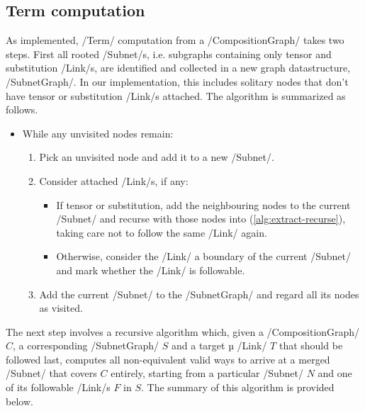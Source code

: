\documentclass[12pt,a4paper]{article}
\begin{document}
\subsection{Term computation}

As implemented, \hs/Term/ computation from a \hs/CompositionGraph/ takes two steps. First all rooted \hs/Subnet/s, i.e. subgraphs containing only tensor and substitution \hs/Link/s, are identified and collected in a new graph datastructure, \hs/SubnetGraph/. In our implementation, this includes solitary nodes that don't have tensor or substitution \hs/Link/s attached. The algorithm is summarized as follows.
\begin{itemize}
    \item While any unvisited nodes remain:\begin{enumerate}
        \item Pick an unvisited node and add it to a new \hs/Subnet/.
        \item\label{alg:extract-recurse} Consider attached \hs/Link/s, if any:\begin{itemize}
            \item If tensor or substitution, add the neighbouring nodes to the current \hs/Subnet/ and recurse with those nodes into (\ref{alg:extract-recurse}), taking care not to follow the same \hs/Link/ again.
            \item Otherwise, consider the \hs/Link/ a boundary of the current \hs/Subnet/ and mark whether the \hs/Link/ is followable.
        \end{itemize}
        \item Add the current \hs/Subnet/ to the \hs/SubnetGraph/ and regard all its nodes as visited.
    \end{enumerate}
\end{itemize}
The next step involves a recursive algorithm which, given a \hs/CompositionGraph/ $C$, a corresponding \hs/SubnetGraph/ $S$ and a target µ \hs/Link/ $T$ that should be followed last, computes all non-equivalent valid ways to arrive at a merged \hs/Subnet/ that covers $C$ entirely, starting from a particular \hs/Subnet/ $N$ and one of its followable \hs/Link/s $F$ in $S$. The summary of this algorithm is provided below.
\end{document}

